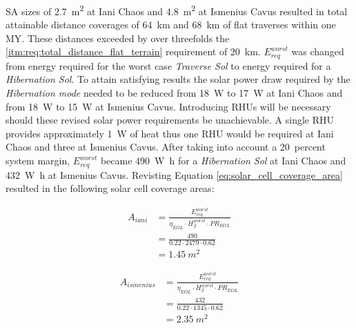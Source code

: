 \clearpage
\ac{SA} sizes of \SI{2.7}{m^{2}} at Iani Chaos and \SI{4.8}{m^{2}} at Ismenius Cavus resulted in total attainable distance coverages of \SI{64}{\kilo\meter} and \SI{68}{\kilo\meter} of flat traverses within one \ac{MY}. These distances exceeded by over threefolds the \ref{itm:req:total_distance_flat_terrain} requirement of \SI{20}{\kilo\meter}. $E_{req}^{worst}$ was changed from energy required for the worst case \textit{Traverse Sol} to energy required for a \textit{Hibernation Sol}. To attain satisfying results the solar power draw required by the \textit{Hibernation mode} needed to be reduced from \SI{18}{\watt} to \SI{17}{\watt} at Iani Chaos and from \SI{18}{\watt} to \SI{15}{\watt} at Ismenius Cavus. Introducing \acp{RHU} will be necessary should these revised solar power requirements be unachievable. A single \ac{RHU} provides approximately \SI{1}{\watt} of heat thus one \ac{RHU} would be required at Iani Chaos and three at Ismenius Cavus. After taking into account a \SI{20}{percent} system margin, $E_{req}^{worst}$ became \SI{490}{\watt\hour} for a \textit{Hibernation Sol} at Iani Chaos and \SI{432}{\watt\hour} at Ismenius Cavus. Revisting Equation \ref{eq:solar_cell_coverage_area} resulted in the following solar cell coverage areas:


\begin{align}
  \label{calc:solar_cell_area_iani_chaos_hibernation}
  A_{iani} &= \frac{E_{req}^{worst}}{\eta_{EOL} \cdot H_{\beta}^{worst} \cdot PR_{EOL}}\\
           &= \frac{490}{0.22 \cdot 2479 \cdot 0.62}\\
           &= \SI{1.45}{m^{2}}
\end{align}

\begin{align}
  \label{calc:solar_cell_area_ismenius_cavus_hibernation}
  A_{ismenius} &= \frac{E_{req}^{worst}}{\eta_{EOL} \cdot H_{\beta}^{worst} \cdot PR_{EOL}}\\
               &= \frac{432}{0.22 \cdot 1345 \cdot 0.62}\\
               &= \SI{2.35}{m^{2}}
\end{align}

